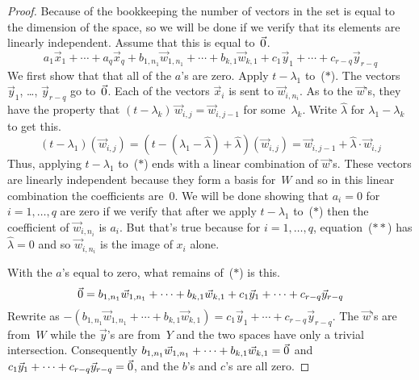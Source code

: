 \begin{proof}
Because of the bookkeeping the number of vectors in the set
is equal to the dimension of the space, so 
we will be done if we verify that its elements are linearly independent.
Assume that this is equal to~$\vec{0}$.
\begin{equation*}
  a_1\vec{x}_1+\cdots+a_q\vec{x}_q   
    +b_{1,n_1}\vec{w}_{1,n_1}+\cdots+b_{k,1}\vec{w}_{k,1} 
    +c_1\vec{y}_1+\cdots+c_{r-q}\vec{y}_{r-q}
  \tag{$*$}
\end{equation*}
We first show that that
all of the $a$'s are zero.
Apply $t-\lambda_1$ to~($*$).
The vectors $\vec{y}_1$, \ldots, $\vec{y}_{r-q}$ 
go to~$\vec{0}$.
Each of the vectors $\vec{x}_i$ is sent to 
$\vec{w}_{i,n_i}$.
As to the $\vec{w}$'s, they have the property that
$(t-\lambda_k)\,\vec{w}_{i,j}=\vec{w}_{i,j-1}$ 
for some~$\lambda_k$.
Write $\hat{\lambda}$ for $\lambda_1-\lambda_k$ to get this.
\begin{equation*}
  (t-\lambda_1)(\vec{w}_{i,j})
    =(t-(\lambda_1-\hat{\lambda})+\hat{\lambda})(\vec{w}_{i,j})
    =\vec{w}_{i,j-1}+\hat{\lambda}\cdot\vec{w}_{i,j} 
  \tag{$**$}
\end{equation*}
Thus, applying $t-\lambda_1$ to~($*$) ends with a 
linear combination of $\vec{w}$'s.
These vectors are linearly independent because
they form a basis for~$W$ and so in this linear combination 
the coefficients are~$0$.
We will be done showing that $a_i=0$ for $i=1,\ldots,q$ are zero if
we verify that after we apply $t-\lambda_1$ to~($*$) then
the coefficient of $\vec{w}_{i,n_i}$ is $a_i$.
But that's true because for $i=1,\ldots,q$, 
equation~($**$) has $\hat{\lambda}=0$
and so $\vec{w}_{i,n_i}$ is the image of $x_{i}$ alone.

With the $a$'s equal to zero, what remains of~($*$) is this.
\begin{equation*}
  \vec{0}
  =
    b_{1,n_1}\vec{w}_{1,n_1}+\cdots+b_{k,1}\vec{w}_{k,1}
    +c_1\vec{y}_1+\cdots+c_{r-q}\vec{y}_{r-q}
\end{equation*}
Rewrite as $-(b_{1,n_1}\vec{w}_{1,n_1}+\cdots+b_{k,1}\vec{w}_{k,1})=
    c_1\vec{y}_1+\cdots+c_{r-q}\vec{y}_{r-q}$.
The $\vec{w}$'s are from~$W$ while the $\vec{y}$'s are from~$Y$ and the
two spaces have only a trivial intersection.
Consequently $b_{1,n_1}\vec{w}_{1,n_1}+\cdots+b_{k,1}\vec{w}_{k,1}=\vec{0}$
and $c_1\vec{y}_1+\cdots+c_{r-q}\vec{y}_{r-q}=\vec{0}$,
and the $b$'s and $c$'s are all zero.
\end{proof}




